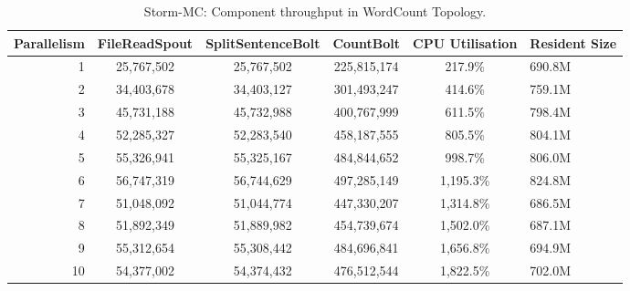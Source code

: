 \documentclass[bsc,twoside,singlespacing,normalheadings,parskip]{infthesis}\usepackage[]{graphicx}\usepackage[]{color}
\begin{document}
\begin{table}[!htb]
\begin{adjustwidth}{-0.5in}{-0.5in}
\centering
\small
\begin{tabular}{@{}rccccl@{}}
    \textbf{Parallelism} & \textbf{FileReadSpout} & \textbf{SplitSentenceBolt} & \textbf{CountBolt} & \textbf{CPU Utilisation} & \textbf{Resident Size} \\ \toprule
    1 & {25,767,502} & {25,767,502} & {225,815,174} & {217.9\%} & {690.8M} \\
    2 & {34,403,678} & {34,403,127} & {301,493,247} & {414.6\%} & {759.1M} \\
    3 & {45,731,188} & {45,732,988} & {400,767,999} & {611.5\%} & {798.4M} \\
    4 & {52,285,327} & {52,283,540} & {458,187,555} & {805.5\%} & {804.1M} \\
	5 & {55,326,941} & {55,325,167} & {484,844,652} & {998.7\%} & {806.0M} \\
	6 & {56,747,319} & {56,744,629} & {497,285,149} & {1,195.3\%} & {824.8M} \\
	7 & {51,048,092} & {51,044,774} & {447,330,207} & {1,314.8\%} & {686.5M} \\
	8 & {51,892,349} & {51,889,982} & {454,739,674} & {1,502.0\%} & {687.1M} \\
	9 & {55,312,654} & {55,308,442} & {484,696,841} & {1,656.8\%} & {694.9M} \\
	10 & {54,377,002} & {54,374,432} & {476,512,544} & {1,822.5\%} & {702.0M} \\
\end{tabular}
\caption{Storm-MC: Component throughput in WordCount Topology.}
\label{table:storm_mc_wordcount}
\end{adjustwidth}
\end{table}
\end{document}
